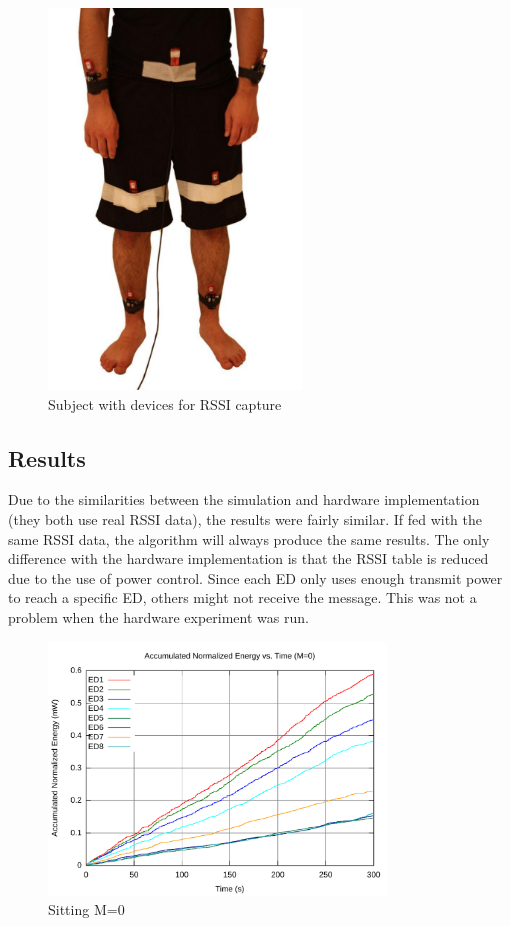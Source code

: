 \documentclass{article}
\begin{document}
\begin{figure}[!htb]
\begin{center}
\includegraphics[width=0.6\textwidth]{figures/halfbody.pdf}
\end{center}
\caption{Subject with devices for RSSI capture}
\label{fig:halfbody}
\end{figure}


\subsection{Results}

Due to the similarities between the simulation and hardware implementation (they both use real RSSI data), the results were fairly similar. If fed with the same RSSI data, the algorithm will always produce the same results. The only difference with the hardware implementation is that the RSSI table is reduced due to the use of power control. Since each ED only uses enough transmit power to reach a specific ED, others might not receive the message. This was not a problem when the hardware experiment was run.

\begin{figure}[!htb]
\includegraphics[width=0.8\textwidth]{figures/sit1-c0.pdf}
\caption{Sitting M=0}
\label{fig:sit1-c0}
\end{figure}
\end{document}
